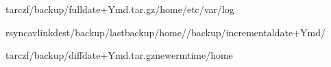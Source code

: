 \documentclass[letterpaper,10pt,english]{sphinxmanual}
\begin{document}
\sphinxAtStartPar
{}

\begin{sphinxVerbatim}[commandchars=\\\{\}]
tar\PYGZhy{}czf/backup/full\PYGZhy{}date+\PYGZpc{}Y\PYGZpc{}m\PYGZpc{}d.tar.gz/home/etc/var/log

rsync\PYGZhy{}av\PYGZhy{}\PYGZhy{}link\PYGZhy{}dest/backup/last\PYGZhy{}backup/home//backup/incremental\PYGZhy{}date+\PYGZpc{}Y\PYGZpc{}m\PYGZpc{}d/

tar\PYGZhy{}czf/backup/diff\PYGZhy{}date+\PYGZpc{}Y\PYGZpc{}m\PYGZpc{}d.tar.gz\PYGZhy{}\PYGZhy{}newer\PYGZhy{}mtime/home
\end{sphinxVerbatim}

\sphinxAtStartPar
{}
\end{document}
